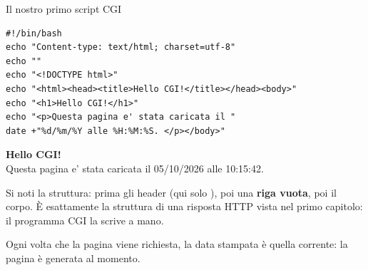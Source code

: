 \begin{esempio}{Il nostro primo script CGI}
\begin{affianco}[0.58][c]
\codicepiccolo
\begin{lstlisting}[style=shell, name=hello.cgi]
#!/bin/bash
echo "Content-type: text/html; charset=utf-8"
echo ""
echo "<!DOCTYPE html>"
echo "<html><head><title>Hello CGI!</title></head><body>"
echo "<h1>Hello CGI!</h1>"
echo "<p>Questa pagina e' stata caricata il "
date +"%d/%m/%Y alle %H:%M:%S. </p></body>"
\end{lstlisting}
\risultato
\begin{browser}
  {\Lora\bfseries\Huge Hello CGI!}\\[6pt]
  Questa pagina e' stata caricata il 05/10/2026 alle 10:15:42.
\end{browser}
\end{affianco}

Si noti la struttura: prima gli header (qui solo ), poi una
\textbf{riga vuota}, poi il corpo. È esattamente la struttura di una risposta
HTTP vista nel primo capitolo: il programma CGI la scrive a mano.

Ogni volta che la pagina viene richiesta, la data stampata è quella corrente:
la pagina è generata al momento.
\end{esempio}

